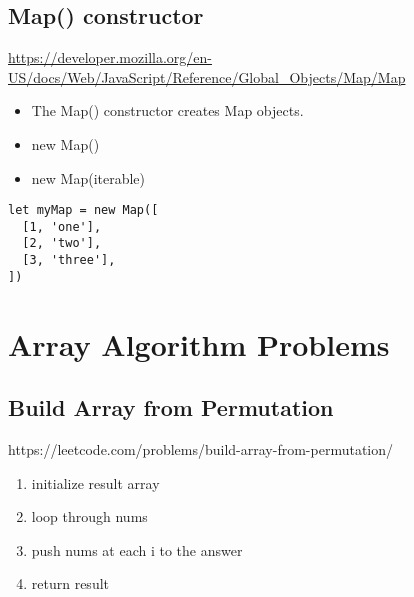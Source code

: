 \documentclass[10pt]{article}
\begin{document}
\medskip %






\medskip %
\pagebreak
\subsection{Map() constructor}

\url{https://developer.mozilla.org/en-US/docs/Web/JavaScript/Reference/Global_Objects/Map/Map}


\begin{itemize}
	\item The Map() constructor creates Map objects.
	\item new Map()
	\item new Map(iterable)
	
\end{itemize}

\begin{lstlisting}[title=Example new Map(), captionpos=t]
let myMap = new Map([
  [1, 'one'],
  [2, 'two'],
  [3, 'three'],
])
\end{lstlisting}

\medskip %
















\pagebreak
\section{Array Algorithm Problems}

\medskip %
\subsection{Build Array from Permutation}
https://leetcode.com/problems/build-array-from-permutation/

\begin{enumerate}
	\item initialize result array
	\item loop through nums
	\item push nums at each i to the answer 
	\item return result
\end{enumerate}
\end{document}
